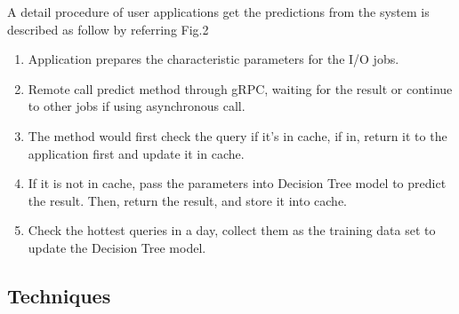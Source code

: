 \documentclass[conference]{IEEEtran}
\begin{document}
A detail procedure of user applications get the predictions from the system is described as follow by referring Fig.2
\begin{enumerate}
    \item Application prepares the characteristic parameters for the I/O jobs.
    \item Remote call predict method through gRPC, waiting for the result or continue to other jobs if using asynchronous call.
    \item The method would first check the query if it's in cache, if in, return it to the application first and update it in cache.
    \item If it is not in cache, pass the parameters into Decision Tree model to predict the result. Then, return the result, and store it into cache.
    \item Check the hottest queries in a day, collect them as the training data set to update the Decision Tree model.
\end{enumerate}


\subsection{Techniques}
\end{document}
